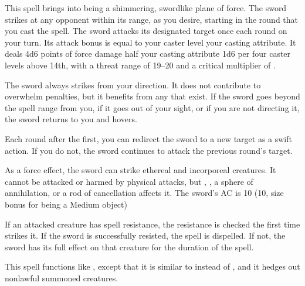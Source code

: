 \spellrng{\rngmed}
\begin{spelleffect}
  This spell brings into being a shimmering, swordlike plane of force. The sword strikes at any opponent within its range, as you desire, starting in the round that you cast the spell. The sword attacks its designated target once each round on your turn. Its attack bonus is equal to your caster level \add your casting attribute. It deals 4d6 points of force damage \add half your casting attribute \add 1d6 per four caster levels above 14th, with a threat range of 19--20 and a critical multiplier of .
  \par The sword always strikes from your direction. It does not contribute to overwhelm penalties, but it benefits from any that exist. If the sword goes beyond the spell range from you, if it goes out of your sight, or if you are not directing it, the sword returns to you and hovers.
\end{spelleffect}
\begin{spellnotes}
  Each round after the first, you can redirect the sword to a new target as a swift action. If you do not, the sword continues to attack the previous round's target.
  \par As a force effect, the sword can strike ethereal and incorporeal creatures. It cannot be attacked or harmed by physical attacks, but , , a sphere of annihilation, or a rod of cancellation affects it. The sword's AC is 10 (10,  size bonus for being a Medium object)
  \par If an attacked creature has spell resistance, the resistance is checked the first time  strikes it. If the sword is successfully resisted, the spell is dispelled. If not, the sword has its full effect on that creature for the duration of the spell.
\end{spellnotes}

\begin{spelleffect}
  This spell functions like , except that it is similar to  instead of , and it hedges out nonlawful summoned creatures.
\end{spelleffect}

